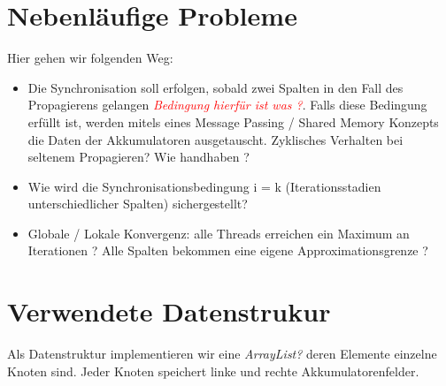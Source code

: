 \section{Nebenläufige Probleme}
Hier gehen wir folgenden Weg:
\begin{itemize}
	\item Die Synchronisation soll erfolgen, sobald zwei Spalten in den Fall des Propagierens gelangen \textcolor{red}{\textit{Bedingung hierfür ist was ?}}. Falls diese Bedingung erfüllt ist, werden mitels eines Message Passing  / Shared Memory Konzepts die Daten der Akkumulatoren ausgetauscht. Zyklisches Verhalten bei seltenem Propagieren? Wie handhaben ?
	\item Wie wird die Synchronisationsbedingung i = k (Iterationsstadien unterschiedlicher Spalten) sichergestellt?
	\item Globale / Lokale Konvergenz: alle Threads erreichen ein Maximum an Iterationen ? Alle Spalten bekommen eine eigene Approximationsgrenze ? 
\end{itemize}

\section{Verwendete Datenstrukur}
Als Datenstruktur implementieren wir eine \textit{ArrayList?} deren Elemente einzelne Knoten sind. Jeder Knoten speichert linke und rechte Akkumulatorenfelder.  


